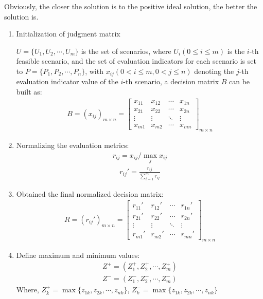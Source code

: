 \documentclass[12pt]{article}  %
\begin{document}
Obviously, the closer the solution is to the positive ideal solution, the better the solution is.
\begin{enumerate}
    \renewcommand{\labelenumi}{\textbf{Step \theenumi}}
\item Initialization of judgment matrix

$U=\{U_1,U_2,\cdots ,U_m\}$ is the set of scenarios, where $U_i(0\le i\le m)$ is the $i$-th feasible scenario, and the set of evaluation indicators for each scenario is set to $P=\{P_1,P_2,\cdots ,P_n\}$, with $x_{ij}(0<i\le m,0<j\le n)$ denoting the $j$-th evaluation indicator value of the $i$-th scenario, a decision matrix $B$ can be built as:
\begin{eqnarray}
B=(x_{ij})_{m\times n}=\begin{bmatrix}
 x_{11} & x_{12} &\cdots& x_{1n}\\
 x_{21} &x_{22}  &\cdots  &x_{2n} \\
  \vdots &\vdots   & \ddots  & \vdots \\
 x_{m1} &x_{m2}  &\cdots  &x_{mn}
\end{bmatrix}_{m\times n}
\end{eqnarray}
\item Normalizing the evaluation metrics:
\begin{eqnarray}
r_{ij}={x_{ij}}/{\max_{j}x_{ij}}
\end{eqnarray}
\begin{eqnarray}
r_{ij}'=\frac{r_{ij}}{\sum_{i=1}^{m}r_{ij}}
\end{eqnarray}
\item Obtained the final normalized decision matrix:
\begin{eqnarray}
R=(r_{ij}')_{m\times n}=\begin{bmatrix}
 r_{11}' & r_{12}' &\cdots& r_{1n}'\\
 r_{21}' &r_{22}'  &\cdots  &r_{2n}' \\
  \vdots &\vdots   & \ddots  & \vdots \\
 r_{m1}' &r_{m2}'  &\cdots  &r_{mn}'
\end{bmatrix}_{m\times n}
\end{eqnarray}
\item Define maximum and minimum values:
\begin{eqnarray}
Z^+=(Z_1^+,Z_2^+,\cdots,Z_m^+)
\end{eqnarray}
\begin{eqnarray}
Z^-=(Z_1^-,Z_2^-,\cdots,Z_m^-)
\end{eqnarray}
Where, $Z_k^+=\max\{z_{1k},z_{2k},\cdots ,z_{nk}\}$, $Z_k^-=\max\{z_{1k},z_{2k},\cdots ,z_{nk}\}$

\end{enumerate}
\end{document}
